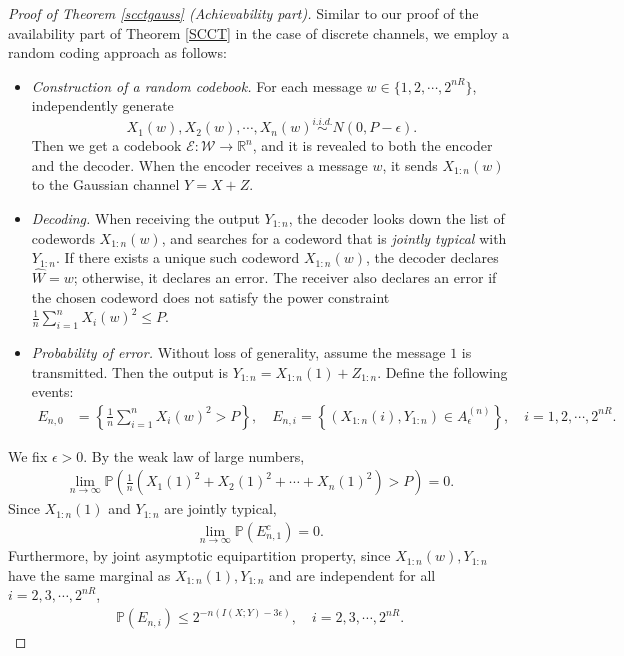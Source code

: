 \documentclass{article}
\numberwithin{equation}{section}
\newcommand{\bbP}{\mathbb{P}}
\newcommand{\bbR}{\mathbb{R}}
\renewcommand{\cal}{\mathcal}
\newcommand{\wh}{\widehat}
\theoremstyle{plain}
\theoremstyle{definition}
\begin{document}
\begin{proof}[Proof of Theorem \ref{scctgauss} (Achievability part)]
Similar to our proof of the availability part of Theorem \ref{SCCT} in the case of discrete channels, we employ a random coding approach as follows:
\begin{itemize}
\item \textit{Construction of a random codebook.} For each message $w\in\{1,2,\cdots,2^{nR}\}$, independently generate $$X_1(w),X_2(w),\cdots,X_n(w)\overset{i.i.d.}{\sim} N(0,P-\epsilon).$$
Then we get a codebook $\mathcal{E}:\cal{W}\to\bbR^n$, and it is revealed to both the encoder and the decoder. When the encoder receives a message $w$, it sends $X_{1:n}(w)$ to the Gaussian channel $Y=X+Z$.
\item \textit{Decoding.} When receiving the output $Y_{1:n}$, the decoder looks down the list of codewords $X_{1:n}(w)$, and searches for a codeword that is \textit{jointly typical} with $Y_{1:n}$. If there exists a unique such codeword $X_{1:n}(w)$, the decoder declares $\wh{W}=w$; otherwise, it declares an error. The receiver also declares an error if the
chosen codeword does not satisfy the power constraint $\frac{1}{n}\sum_{i=1}^n X_i(w)^2\leq P$.
\item\textit{Probability of error.} Without loss of generality, assume the message $1$ is transmitted. Then the output is $Y_{1:n}=X_{1:n}(1)+Z_{1:n}$. Define the following events:
\begin{align*}
	E_{n,0}&=\left\{\frac{1}{n}\sum_{i=1}^n X_i(w)^2> P\right\},\quad E_{n,i}=\left\{(X_{1:n}(i),Y_{1:n})\in A_\epsilon^{(n)}\right\},\quad i=1,2,\cdots,2^{nR}.
\end{align*}
\end{itemize}
We fix $\epsilon>0$. By the weak law of large numbers,
\begin{align*}
	\lim_{n\to\infty}\bbP\left(\frac{1}{n}\left(X_1(1)^2+X_2(1)^2+\cdots+X_n(1)^2\right)>P\right)=0.
\end{align*}
Since $X_{1:n}(1)$ and $Y_{1:n}$ are jointly typical,
\begin{align*}
	\lim_{n\to\infty}\bbP(E_{n,1}^c)=0.
\end{align*}
Furthermore, by joint asymptotic equipartition property, since $X_{1:n}(w),Y_{1:n}$ have the same marginal as $X_{1:n}(1),Y_{1:n}$ and are independent for all $i=2,3,\cdots,2^{nR}$,
\begin{align*}
	\bbP(E_{n,i})\leq 2^{-n(I(X;Y)-3\epsilon)},\quad i=2,3,\cdots,2^{nR}.
\end{align*}

\end{proof}
\end{document}
